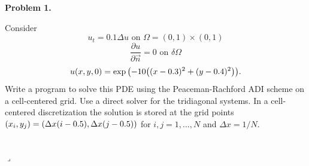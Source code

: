 \documentclass[12pt]{article}
\newenvironment{myprob}[1]
    {%
    \noindent{\Huge$\ulcorner$}\textbf{#1.}\begin{em}
    }
    { 
    \end{em} \\ \hphantom{l} \hfill {\Huge$\lrcorner$} }
\begin{document}
\rhead{\today}

{\let\newpage\relax} 


\begin{myprob}{Problem 1}
Consider 
$$u_t = 0.1 \Delta u \text{ on } \Omega = (0,1) \times (0,1) $$
$$\dfrac{\partial u}{\partial \vec{n}}=0 \text{ on } \delta \Omega $$
$$u(x,y,0)=\exp\qty(-10\qty((x-0.3)^2+(y-0.4)^2)) .$$
Write a program to solve this PDE using the Peaceman-Rachford ADI
scheme on a cell-centered grid. Use a direct solver for the tridiagonal
systems. In a cell-centered discretization the solution is stored at the
grid points $(x_i,y_j)=\qty(\Delta x(i-0.5),\Delta x(j-0.5))$ for $i,j = 1, \dots, N$ and $\Delta x = 1/N$. 
\end{myprob}
\end{document}
